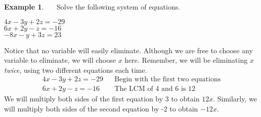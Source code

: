 \documentclass[12pt]{book}
\theoremstyle{definition}
\newtheorem{example}{Example}
\begin{document}
\begin{example}~~~Solve the following system of equations.
\begin{center}
		$4 x - 3 y + 2 z = - 29~$\\
		$6 x + 2 y - z = - 16$\\
		$- 8 x - y + 3 z = 23~~~~$
\end{center}
Notice that no variable will easily eliminate.  Although we are free to choose any variable to eliminate, we will choose $x$ here.  Remember, we will be eliminating $x$ {\it twice}, using two different equations each time.
	\begin{eqnarray*}
    4 x - 3 y + 2 z = - 29 &  & \text{Begin~with~the~first~two~equations}\\
		6 x + 2 y - z = - 16& & \text{The~LCM~of~} 4 \text{~and~} 6 \text{~is~} 12%
	\end{eqnarray*}
We will multiply both sides of the first equation by 3 to obtain $12x$.  Similarly, we will multiply both sides of the second equation by -2 to obtain $-12x$.


\end{example}
\end{document}
